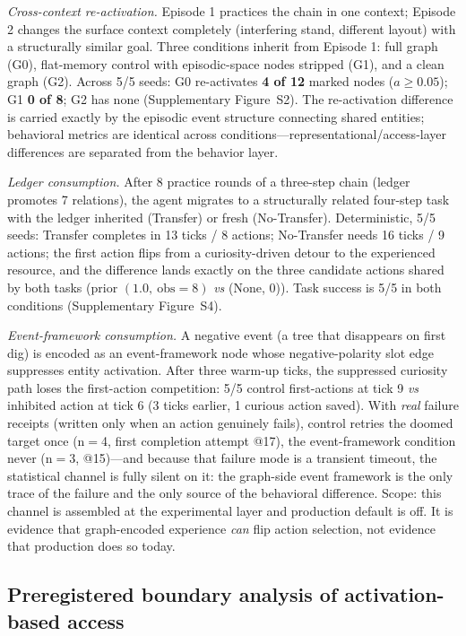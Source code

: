 \documentclass[10pt]{article}
\begin{document}
\emph{Cross-context re-activation.} Episode 1 practices the chain in one context; Episode 2 changes the surface context completely (interfering stand, different layout) with a structurally similar goal. Three conditions inherit from Episode 1: full graph (G0), flat-memory control with episodic-space nodes stripped (G1), and a clean graph (G2). Across 5/5 seeds: G0 re-activates \textbf{4 of 12} marked nodes ($a\ge0.05$); G1 \textbf{0 of 8}; G2 has none (Supplementary Figure~S2). The re-activation difference is carried exactly by the episodic event structure connecting shared entities; behavioral metrics are identical across conditions---representational/access-layer differences are separated from the behavior layer.

\emph{Ledger consumption.} After 8 practice rounds of a three-step chain (ledger promotes 7 relations), the agent migrates to a structurally related four-step task with the ledger inherited (Transfer) or fresh (No-Transfer). Deterministic, 5/5 seeds: Transfer completes in 13 ticks / 8 actions; No-Transfer needs 16 ticks / 9 actions; the first action flips from a curiosity-driven detour to the experienced resource, and the difference lands exactly on the three candidate actions shared by both tasks (prior $(1.0,\ \text{obs}{=}8)$ \emph{vs} (None, 0)). Task success is 5/5 in both conditions (Supplementary Figure~S4).

\emph{Event-framework consumption.} A negative event (a tree that disappears on first dig) is encoded as an event-framework node whose negative-polarity slot edge suppresses entity activation. After three warm-up ticks, the suppressed curiosity path loses the first-action competition: 5/5 control first-actions at tick 9 \emph{vs} inhibited action at tick 6 (3 ticks earlier, 1 curious action saved). With \emph{real} failure receipts (written only when an action genuinely fails), control retries the doomed target once (n$=$4, first completion attempt @17), the event-framework condition never (n$=$3, @15)---and because that failure mode is a transient timeout, the statistical channel is fully silent on it: the graph-side event framework is the only trace of the failure and the only source of the behavioral difference. Scope: this channel is assembled at the experimental layer and production default is off. It is evidence that graph-encoded experience \emph{can} flip action selection, not evidence that production does so today.

\subsection{Preregistered boundary analysis of activation-based access}
\label{sec:res-boundary}
\end{document}
